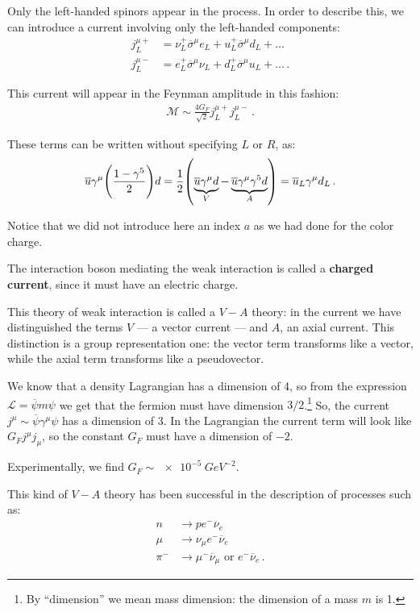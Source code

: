 \documentclass[main.tex]{subfiles}
\begin{document}
Only the left-handed spinors appear in the process. In order to describe this, we can introduce a current involving only the left-handed components: 
%
\begin{align}
j^{\mu +}_{L} &= \nu ^+_{L} \overline{\sigma}^{\mu } e_{L} + u ^+_{L} \overline{\sigma}^{\mu } d_{L} + \dots \\
j^{\mu -}_{L} &= e ^+_{L} \overline{\sigma}^{\mu } \nu_{L} + d ^+_{L} \overline{\sigma}^{\mu } u_{L} + \dots
\,.
\end{align}

This current will appear in the Feynman amplitude in this fashion: 
%
\begin{align}
\mathcal{M} \sim \frac{4 G_F}{\sqrt{2}} j^{\mu +}_{L} j^{\mu -}_{L} 
\,.
\end{align}

These terms can be written without specifying \(L\) or \(R\), as:
%
\begin{align}
\overline{u} \gamma^{\mu } \qty( \frac{1-\gamma^{5}}{2})d 
= \frac{1}{2} \qty(\underbrace{\overline{u}\gamma^{\mu } d}_{V} - \underbrace{\overline{u}\gamma^{\mu } \gamma^{5} d}_{A} )
= \overline{u}_L \gamma^{\mu } d_L
\,.
\end{align}

Notice that we did not introduce here an index \(a\) as we had done for the color charge. 

The interaction boson mediating the weak interaction is called a \textbf{charged current}, since it must have an electric charge.

This theory of weak interaction is called a \(V-A\) theory: in the current we have distinguished the terms \(V\) --- a vector current --- and  \(A\), an axial current. This distinction is a group representation one: the vector term transforms like a vector, while the axial term transforms like a pseudovector.

We know that a density Lagrangian has a dimension of 4, so from the expression \(\mathscr{L} = \overline{\psi} m \psi \) we get that the fermion must have dimension \(3/2\).\footnote{By ``dimension'' we mean mass dimension: the dimension of a mass \(m\) is 1.} 
So, the current \(j^{\mu } \sim \overline{\psi} \gamma^{\mu } \psi \) has a dimension of 3.
In the Lagrangian the current term will look like \(G_F j^{\mu } j_{\mu }\), so the constant \(G_F\) must have a dimension of \(-2\). 

Experimentally, we find \(G_F \sim \SI{e-5}{GeV^{-2}}\). 

This kind of \(V-A\) theory has been successful in the description of processes such as: 
%
\begin{align}
n &\to p e^{-} \overline{\nu}_{e}  \\
\mu &\to \nu_{\mu }  e^{-} \overline{\nu}_{e}  \\
\pi^{-} &\to \mu^- \overline{\nu}_{\mu } \text{ or } e^{-} \overline{\nu}_{e}
\,.
\end{align}
\end{document}
